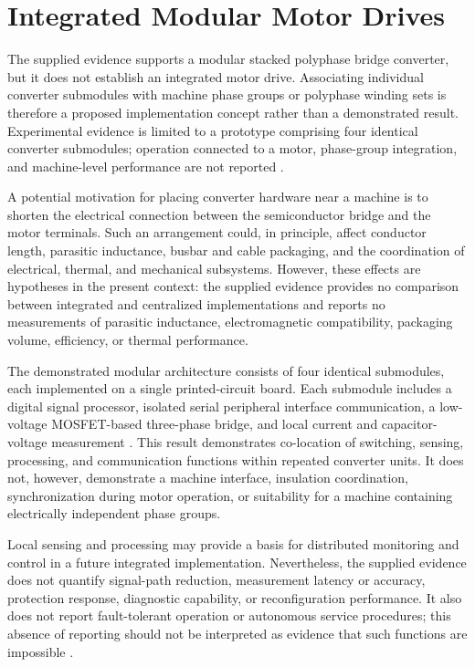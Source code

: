\section{Integrated Modular Motor Drives}

The supplied evidence supports a modular stacked polyphase bridge converter, but it does not establish an integrated motor drive. Associating individual converter submodules with machine phase groups or polyphase winding sets is therefore a proposed implementation concept rather than a demonstrated result. Experimental evidence is limited to a prototype comprising four identical converter submodules; operation connected to a motor, phase-group integration, and machine-level performance are not reported \cite{Jin2017}. %

A potential motivation for placing converter hardware near a machine is to shorten the electrical connection between the semiconductor bridge and the motor terminals. Such an arrangement could, in principle, affect conductor length, parasitic inductance, busbar and cable packaging, and the coordination of electrical, thermal, and mechanical subsystems. However, these effects are hypotheses in the present context: the supplied evidence provides no comparison between integrated and centralized implementations and reports no measurements of parasitic inductance, electromagnetic compatibility, packaging volume, efficiency, or thermal performance. %

The demonstrated modular architecture consists of four identical submodules, each implemented on a single printed-circuit board. Each submodule includes a digital signal processor, isolated serial peripheral interface communication, a low-voltage MOSFET-based three-phase bridge, and local current and capacitor-voltage measurement \cite{Jin2017}. This result demonstrates co-location of switching, sensing, processing, and communication functions within repeated converter units. It does not, however, demonstrate a machine interface, insulation coordination, synchronization during motor operation, or suitability for a machine containing electrically independent phase groups.

Local sensing and processing may provide a basis for distributed monitoring and control in a future integrated implementation. Nevertheless, the supplied evidence does not quantify signal-path reduction, measurement latency or accuracy, protection response, diagnostic capability, or reconfiguration performance. It also does not report fault-tolerant operation or autonomous service procedures; this absence of reporting should not be interpreted as evidence that such functions are impossible \cite{Jin2017}. %

